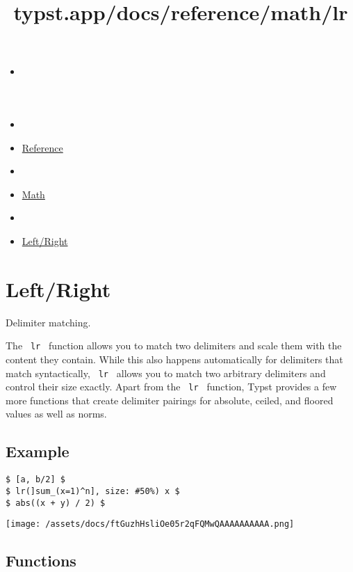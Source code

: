 \title{typst.app/docs/reference/math/lr}

\begin{itemize}
\tightlist
\item
  \href{/docs}{}
\item
  
\item
  \href{/docs/reference/}{Reference}
\item
  
\item
  \href{/docs/reference/math/}{Math}
\item
  
\item
  \href{/docs/reference/math/lr}{Left/Right}
\end{itemize}

\section{Left/Right}\label{summary}

Delimiter matching.

The \texttt{\ lr\ } function allows you to match two delimiters and
scale them with the content they contain. While this also happens
automatically for delimiters that match syntactically, \texttt{\ lr\ }
allows you to match two arbitrary delimiters and control their size
exactly. Apart from the \texttt{\ lr\ } function, Typst provides a few
more functions that create delimiter pairings for absolute, ceiled, and
floored values as well as norms.

\subsection{Example}\label{example}

\begin{verbatim}
$ [a, b/2] $
$ lr(]sum_(x=1)^n], size: #50%) x $
$ abs((x + y) / 2) $
\end{verbatim}

\texttt{[image: /assets/docs/ftGuzhHsliOe05r2qFQMwQAAAAAAAAAA.png]}

\subsection{Functions}\label{functions}

